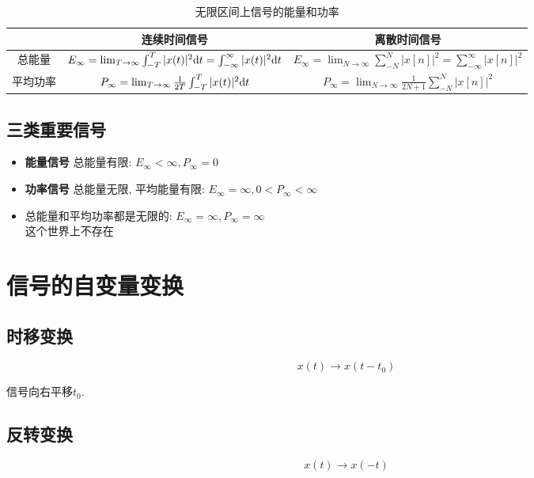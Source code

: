     \begin{table}[h]\centering
        \caption{无限区间上信号的能量和功率}
        \label{tab:2:universal-energy-and-power}
        \begin{tabular}{ccc} \toprule
            & 连续时间信号 & 离散时间信号 \\ \midrule
            总能量 & $ E_\infty=\lim_{T\to \infty}\int_{-T}^T|x(t)|^2\mathrm{d} t=\int_{-\infty}^\infty|x(t)|^2\mathrm{d} t $ & $E_\infty=\lim_{N\to \infty}\sum_{-N}^N|x[n]|^2=\sum_{-\infty}^\infty|x[n]|^2$\\ 
            平均功率 & $P_\infty=\lim_{T\to \infty}\frac{1}{2T}\int_{-T}^T|x(t)|^2\mathrm{d} t$ & $P_\infty=\lim_{N\to \infty}\frac{1}{2N+1}\sum_{-N}^N|x[n]|^2$ \\ \bottomrule
        \end{tabular}
    \end{table}

    \subsection{三类重要信号}
    
    \begin{itemize}
        \item \textbf{能量信号} 总能量有限: $E_\infty<\infty, P_\infty=0$
        \item \textbf{功率信号} 总能量无限, 平均能量有限: $E_\infty=\infty, 0<P_\infty<\infty$
        \item 总能量和平均功率都是无限的: $E_\infty=\infty, P_\infty=\infty$ \\
            这个世界上不存在
    \end{itemize}

\section{信号的自变量变换}

    \subsection{时移变换}

        \[x(t)\to x(t-t_0)\]

        信号向右平移$t_0$.

    \subsection{反转变换}

        \[x(t)\to x(-t)\]

